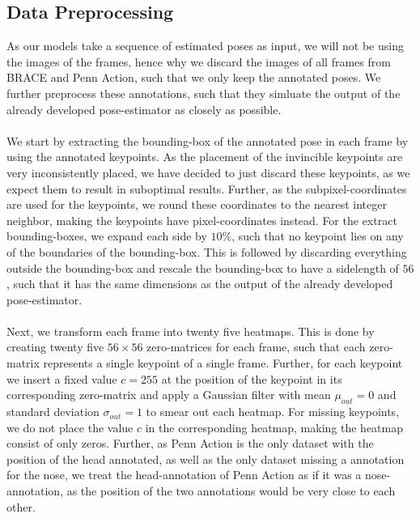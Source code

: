 \documentclass[./main.tex]{subfiles}
\begin{document}
\subsection{Data Preprocessing}
As our models take a sequence of estimated poses as input, we will not be using the images of the frames, hence why we discard the images of all frames from BRACE and Penn Action, such that we only keep the annotated poses. We further preprocess these annotations, such that they simluate the output of the already developed pose-estimator as closely as possible.
\\
\\
We start by extracting the bounding-box of the annotated pose in each frame by using the annotated keypoints. As the placement of the invincible keypoints are very inconsistently placed, we have decided to just discard these keypoints, as we expect them to result in suboptimal results. Further, as the subpixel-coordinates are used for the keypoints, we round these coordinates to the nearest integer neighbor, making the keypoints have pixel-coordinates instead. For the extract bounding-boxes, we expand each side by $10\%$, such that no keypoint lies on any of the boundaries of the bounding-box. This is followed by discarding everything outside the bounding-box and rescale the bounding-box to have a sidelength of $56$, such that it has the same dimensions as the output of the already developed pose-estimator.
\\
\\
Next, we transform each frame into twenty five heatmaps. This is done by creating twenty five $56 \times 56$ zero-matrices for each frame, such that each zero-matrix represents a single keypoint of a single frame. Further, for each keypoint we insert a fixed value $c = 255$ at the position of the keypoint in its corresponding zero-matrix and apply a Gaussian filter with mean $\mu_{out} = 0$ and standard deviation $\sigma_{out} = 1$ to smear out each heatmap. For missing keypoints, we do not place the value $c$ in the corresponding heatmap, making the heatmap consist of only zeros. Further, as Penn Action is the only dataset with the position of the head annotated, as well as the only dataset missing a annotation for the nose, we treat the head-annotation of Penn Action as if it was a nose-annotation, as the position of the two annotations would be very close to each other.
\\
\\
\end{document}
